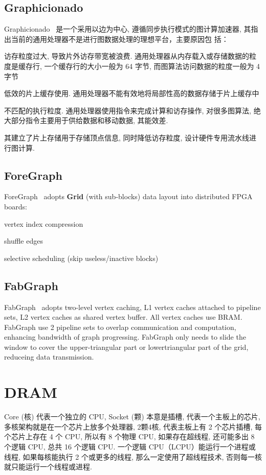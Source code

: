 \documentclass[UTF8,12pt,a4paper]{article}
\begin{document}
\subsection{Graphicionado}
Graphicionado~\cite{DBLP:conf/micro/HamWSSM16}
是一个采用以边为中心, 遵循同步执行模式的图计算加速器,
其指出当前的通用处理器不是进行图数据处理的理想平台，主要原因包
括：
\begin{compactitem}
  \item 访存粒度过大, 导致片外访存带宽被浪费.
  通用处理器从内存载入或存储数据的粒度是缓存行,
  一个缓存行的大小一般为 64 字节, 而图算法访问数据的粒度一般为 4 字节
  \item 低效的片上缓存使用. 通用处理器不能有效地将局部性高的数据存储于片上缓存中
  \item 不匹配的执行粒度. 通用处理器使用指令来完成计算和访存操作,
  对很多图算法, 绝大部分指令主要用于供给数据和移动数据, 其能效差.
\end{compactitem}
其建立了片上存储用于存储顶点信息, 同时降低访存粒度, 设计硬件专用流水线进行图计算.

\subsection{ForeGraph}
ForeGraph~\cite{DBLP:conf/fpga/DaiHCXWY17}
adopts \textbf{Grid} (with sub-blocks)
data layout into distributed FPGA boards:
\begin{compactitem}
  \item vertex index compression
  \item shuffle edges
  \item selective scheduling (skip useless/inactive blocks)
\end{compactitem}


\subsection{FabGraph}
FabGraph~\cite{DBLP:conf/fpga/ShaoLHL019}
adopts two-level vertex caching,
L1 vertex caches attached to pipeline sets,
L2 vertex caches as shared vertex buffer.
All vertex caches use BRAM.
FabGraph use 2 pipeline sets to overlap
communication and computation,
enhancing bandwidth of graph progressing.
FabGraph only needs to slide the window
to cover the upper-triangular part or lowertriangular part of the grid,
reduceing data transmission.

\clearpage

\section{DRAM}
Core (核) 代表一个独立的 CPU, Socket (颗) 本意是插槽,
代表一个主板上的芯片, 多核架构就是在一个芯片上放多个处理器,
2颗4核, 代表主板上有 2 个芯片插槽, 每个芯片上存在 4 个 CPU, 所以有 8 个物理 CPU,
如果存在超线程, 还可能多出 8 个逻辑 CPU, 总共 16 个逻辑 CPU.
一个逻辑 CPU（LCPU）能运行一个进程或线程, 如果每核能执行 2 个或更多的线程,
那么一定使用了超线程技术, 否则每一核就只能运行一个线程或进程.
\end{document}
